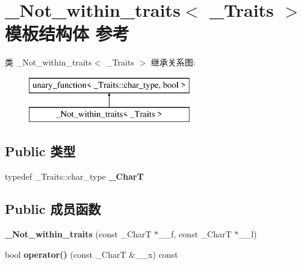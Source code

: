\hypertarget{struct___not__within__traits}{}\section{\+\_\+\+Not\+\_\+within\+\_\+traits$<$ \+\_\+\+Traits $>$ 模板结构体 参考}
\label{struct___not__within__traits}
类 \+\_\+\+Not\+\_\+within\+\_\+traits$<$ \+\_\+\+Traits $>$ 继承关系图\+:\begin{figure}[H]
\begin{center}
\leavevmode
\includegraphics[height=2.000000cm]{struct___not__within__traits}
\end{center}
\end{figure}
\subsection*{Public 类型}
\begin{DoxyCompactItemize}
\item 
\mbox{\label{struct___not__within__traits_a8fd7f0c35cd34ad79aecd13c6442a247}} 
typedef \+\_\+\+Traits\+::char\+\_\+type {\bfseries \+\_\+\+CharT}
\end{DoxyCompactItemize}
\subsection*{Public 成员函数}
\begin{DoxyCompactItemize}
\item 
\mbox{\label{struct___not__within__traits_a0f6a108fa0e0938b3473380fd471fc77}} 
{\bfseries \+\_\+\+Not\+\_\+within\+\_\+traits} (const \+\_\+\+CharT $\ast$\+\_\+\+\_\+f, const \+\_\+\+CharT $\ast$\+\_\+\+\_\+l)
\item 
\mbox{\label{struct___not__within__traits_a37bf8d67fd5811387c6f5961a844c3c9}} 
bool {\bfseries operator()} (const \+\_\+\+CharT \&\+\_\+\+\_\+x) const
\end{DoxyCompactItemize}
